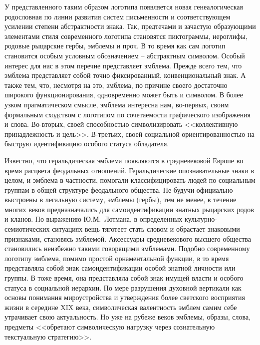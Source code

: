У представленного таким образом логотипа появляется новая генеалогическая
родословная по линии развития систем письменности и соответствующем усилении
степени абстрактности знака. Так, предтечами и зачастую образующими элементами
стиля современного логотипа становятся пиктограммы, иероглифы, родовые рыцарские
гербы, эмблемы и проч. В то время как сам логотип становится особым условным обозначением --
абстрактным символом. Особый интерес для нас в этом перечне представляет эмблема.
Прежде всего тем, что эмблема представляет собой точно фиксированный,
конвенциональный знак. А также тем, что, несмотря на это, эмблема, по причине своего
достаточно широкого функционирования, одновременно может быть и символом\autocite[][268]{losev1976}.
В более узком прагматическом смысле, эмблема интересна нам, во-первых,
своим формальным сходством с логотипом по сочетаемости графического изображения и слова.
Во-вторых, своей способностью символизировать <<коллективную принадлежность и цель>>\autocite[][14]{elbrunn2003}.
В-третьих, своей социальной ориентированностью на быструю идентификацию особого статуса обладателя.

Известно, что геральдическая эмблема появляются в средневековой Европе во время
расцвета феодальных отношений. Геральдические опознавательные знаки в целом, и
эмблема в частности, помогали классифицировать людей по социальным группам в
общей структуре феодального общества. Не будучи официально выстроены в легальную
систему, эмблемы (гербы), тем не менее, в течение многих веков предназначались для
самоидентификации знатных рыцарских родов и кланов. По выражению Ю.М.~Лотмана, в
определенных культурно-семиотических ситуациях вещь тяготеет стать словом и
обрастает знаковыми признаками, становясь эмблемой\autocite[][341-342]{lotman2002}.
Аксессуары средневекового высшего общества становились неизбежно такими говорящими эмблемами.
Подобно современному логотипу эмблема, помимо простой орнаментальной функции,
в то время представляла собой знак самоидентификации особой знатной личности или
группы. В тоже время, она представляла собой знак имущей власти и особого
статуса в социальной иерархии. По мере разрушения духовной вертикали как основы
понимания мироустройства и утверждения более светского восприятия жизни в середине
XIX века, символическая валентность эмблем самим себе утрачивает свою актуальность.
Но уже на рубеже веков эмблемы, образы, слова, предметы <<обретают символическую
нагрузку через сознательную текстуальную стратегию>>\autocite{rebekkini2006}.

